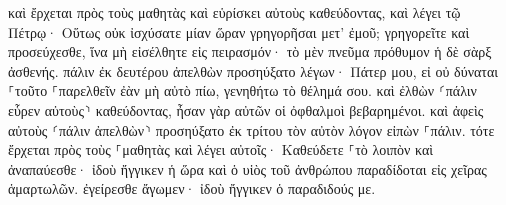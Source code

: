 \documentclass{openreader}
\begin{document}
καὶ ἔρχεται πρὸς τοὺς μαθητὰς καὶ εὑρίσκει αὐτοὺς καθεύδοντας, καὶ λέγει τῷ Πέτρῳ· Οὕτως οὐκ ἰσχύσατε μίαν ὥραν γρηγορῆσαι μετ’ ἐμοῦ; 
γρηγορεῖτε καὶ προσεύχεσθε, ἵνα μὴ εἰσέλθητε εἰς πειρασμόν· τὸ μὲν πνεῦμα πρόθυμον ἡ δὲ σὰρξ ἀσθενής. 
πάλιν ἐκ δευτέρου ἀπελθὼν προσηύξατο λέγων· Πάτερ μου, εἰ οὐ δύναται ⸀τοῦτο ⸀παρελθεῖν ἐὰν μὴ αὐτὸ πίω, γενηθήτω τὸ θέλημά σου. 
καὶ ἐλθὼν ⸂πάλιν εὗρεν αὐτοὺς⸃ καθεύδοντας, ἦσαν γὰρ αὐτῶν οἱ ὀφθαλμοὶ βεβαρημένοι. 
καὶ ἀφεὶς αὐτοὺς ⸂πάλιν ἀπελθὼν⸃ προσηύξατο ἐκ τρίτου τὸν αὐτὸν λόγον εἰπὼν ⸀πάλιν. 
τότε ἔρχεται πρὸς τοὺς ⸀μαθητὰς καὶ λέγει αὐτοῖς· Καθεύδετε ⸀τὸ λοιπὸν καὶ ἀναπαύεσθε· ἰδοὺ ἤγγικεν ἡ ὥρα καὶ ὁ υἱὸς τοῦ ἀνθρώπου παραδίδοται εἰς χεῖρας ἁμαρτωλῶν. 
ἐγείρεσθε ἄγωμεν· ἰδοὺ ἤγγικεν ὁ παραδιδούς με. 
\end{document}
